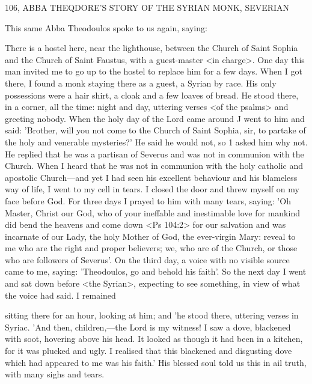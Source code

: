 106, ABBA THEQDORE'S STORY OF THE
SYRIAN MONK, SEVERIAN

This same Abba Theodoulos spoke to us again, saying:

There is a hostel here, near the lighthouse, between the Church of
Saint Sophia and the Church of Saint Faustus, with a guest-master
<in charge>.
One day this man invited me to go up to the hostel to
replace him for a few days.
When I got there, I found a monk
staying there as a guest, a Syrian by race.
His only possessions were
a hair shirt, a cloak and a few loaves of bread.
He stood there, in
a corner, all the time: night and day, uttering verses <of the
psalms> and greeting nobody.
When the holy day of the Lord came
around J went to him and said: 'Brother, will you not come to the
Church of Saint Sophia, sir, to partake of the holy and venerable
mysteries?' He said he would not, so 1 asked him why not.
He
replied that he was a partisan of Severus and was not in communion
with the Church.
When I heard that he was not in communion with
the holy catholic and apostolic Church—and yet I had seen his
excellent behaviour and his blameless way of life, I went to my cell
in tears.
I closed the door and threw myself on my face before God.
For three days I prayed to him with many tears, saying: 'Oh
Master, Christ our God, who of your ineffable and inestimable love
for mankind did bend the heavens and come down <Ps 104:2> for
our salvation and was incarnate of our Lady, the holy Mother of
God, the ever-virgin Mary: reveal to me who are the right and
proper believers; we, who are of the Church, or those who are
followers of Severus'.
On the third day, a voice with no visible
source came to me, saying: 'Theodoulos, go and behold his faith'.
So the next day I went and sat down before <the Syrian>, expecting
to see something, in view of what the voice had said.
I remained

sitting there for an hour, looking at him; and 'he stood there,
uttering verses in Syriac.
'And then, children,—the Lord is my
witness! I saw a dove, blackened with soot, hovering above his head.
It looked as though it had been in a kitchen, for it was plucked and
ugly.
I realised that this blackened and disgusting dove which had
appeared to me was his faith.' His blessed soul told us this in ail
truth, with many sighs and tears.

